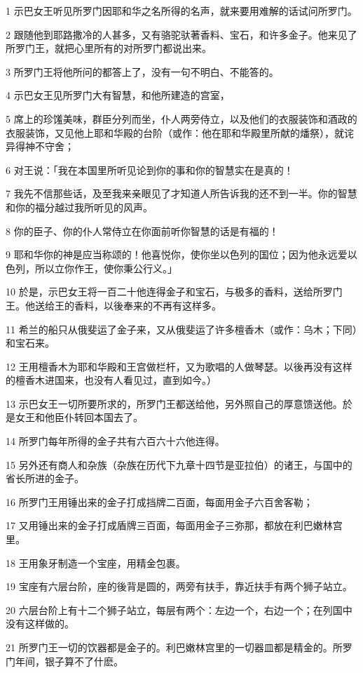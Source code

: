 \par 1 示巴女王听见所罗门因耶和华之名所得的名声，就来要用难解的话试问所罗门。
\par 2 跟随他到耶路撒冷的人甚多，又有骆驼驮著香料、宝石，和许多金子。他来见了所罗门王，就把心里所有的对所罗门都说出来。
\par 3 所罗门王将他所问的都答上了，没有一句不明白、不能答的。
\par 4 示巴女王见所罗门大有智慧，和他所建造的宫室，
\par 5 席上的珍馐美味，群臣分列而坐，仆人两旁侍立，以及他们的衣服装饰和酒政的衣服装饰，又见他上耶和华殿的台阶（或作：他在耶和华殿里所献的燔祭），就诧异得神不守舍；
\par 6 对王说：「我在本国里所听见论到你的事和你的智慧实在是真的！
\par 7 我先不信那些话，及至我来亲眼见了才知道人所告诉我的还不到一半。你的智慧和你的福分越过我所听见的风声。
\par 8 你的臣子、你的仆人常侍立在你面前听你智慧的话是有福的！
\par 9 耶和华你的神是应当称颂的！他喜悦你，使你坐以色列的国位；因为他永远爱以色列，所以立你作王，使你秉公行义。」
\par 10 於是，示巴女王将一百二十他连得金子和宝石，与极多的香料，送给所罗门王。他送给王的香料，以後奉来的不再有这样多。
\par 11 希兰的船只从俄斐运了金子来，又从俄斐运了许多檀香木（或作：乌木；下同）和宝石来。
\par 12 王用檀香木为耶和华殿和王宫做栏杆，又为歌唱的人做琴瑟。以後再没有这样的檀香木进国来，也没有人看见过，直到如今。）
\par 13 示巴女王一切所要所求的，所罗门王都送给他，另外照自己的厚意馈送他。於是女王和他臣仆转回本国去了。
\par 14 所罗门每年所得的金子共有六百六十六他连得。
\par 15 另外还有商人和杂族（杂族在历代下九章十四节是亚拉伯）的诸王，与国中的省长所进的金子。
\par 16 所罗门王用锤出来的金子打成挡牌二百面，每面用金子六百舍客勒；
\par 17 又用锤出来的金子打成盾牌三百面，每面用金子三弥那，都放在利巴嫩林宫里。
\par 18 王用象牙制造一个宝座，用精金包裹。
\par 19 宝座有六层台阶，座的後背是圆的，两旁有扶手，靠近扶手有两个狮子站立。
\par 20 六层台阶上有十二个狮子站立，每层有两个：左边一个，右边一个；在列国中没有这样做的。
\par 21 所罗门王一切的饮器都是金子的。利巴嫩林宫里的一切器皿都是精金的。所罗门年间，银子算不了什麽。
